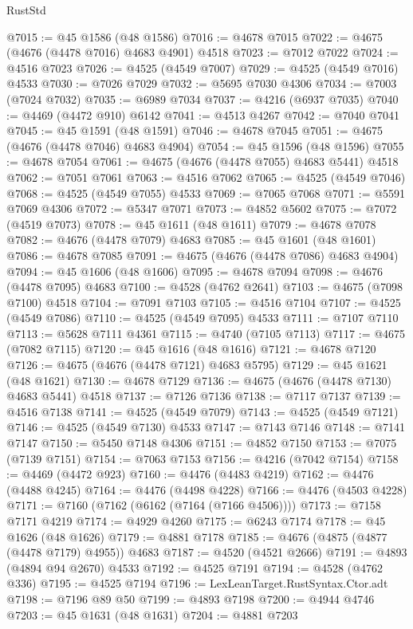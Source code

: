\begin{lexlean}{RustStd}
\begin{coremodule}
{\begin{coremodule}
{{{{{{{{{{{{{{{{{{{{{{{{{{{{{{{{{{{{{{{{{{{{{{{{{{{{{{{{{{{{@7015 := @45 @1586 (@48 @1586)
@7016 := @4678 @7015
@7022 := @4675 (@4676 (@4478 @7016) @4683 @4901) @4518
@7023 := @7012 @7022
@7024 := @4516 @7023
@7026 := @4525 (@4549 @7007)
@7029 := @4525 (@4549 @7016) @4533
@7030 := @7026 @7029
@7032 := @5695 @7030 @4306
@7034 := @7003 (@7024 @7032)
@7035 := @6989 @7034
@7037 := @4216 (@6937 @7035)
@7040 := @4469 (@4472 @910) @6142
@7041 := @4513 @4267
@7042 := @7040 @7041
@7045 := @45 @1591 (@48 @1591)
@7046 := @4678 @7045
@7051 := @4675 (@4676 (@4478 @7046) @4683 @4904)
@7054 := @45 @1596 (@48 @1596)
@7055 := @4678 @7054
@7061 := @4675 (@4676 (@4478 @7055) @4683 @5441) @4518
@7062 := @7051 @7061
@7063 := @4516 @7062
@7065 := @4525 (@4549 @7046)
@7068 := @4525 (@4549 @7055) @4533
@7069 := @7065 @7068
@7071 := @5591 @7069 @4306
@7072 := @5347 @7071
@7073 := @4852 @5602
@7075 := @7072 (@4519 @7073)
@7078 := @45 @1611 (@48 @1611)
@7079 := @4678 @7078
@7082 := @4676 (@4478 @7079) @4683
@7085 := @45 @1601 (@48 @1601)
@7086 := @4678 @7085
@7091 := @4675 (@4676 (@4478 @7086) @4683 @4904)
@7094 := @45 @1606 (@48 @1606)
@7095 := @4678 @7094
@7098 := @4676 (@4478 @7095) @4683
@7100 := @4528 (@4762 @2641)
@7103 := @4675 (@7098 @7100) @4518
@7104 := @7091 @7103
@7105 := @4516 @7104
@7107 := @4525 (@4549 @7086)
@7110 := @4525 (@4549 @7095) @4533
@7111 := @7107 @7110
@7113 := @5628 @7111 @4361
@7115 := @4740 (@7105 @7113)
@7117 := @4675 (@7082 @7115)
@7120 := @45 @1616 (@48 @1616)
@7121 := @4678 @7120
@7126 := @4675 (@4676 (@4478 @7121) @4683 @5795)
@7129 := @45 @1621 (@48 @1621)
@7130 := @4678 @7129
@7136 := @4675 (@4676 (@4478 @7130) @4683 @5441) @4518
@7137 := @7126 @7136
@7138 := @7117 @7137
@7139 := @4516 @7138
@7141 := @4525 (@4549 @7079)
@7143 := @4525 (@4549 @7121)
@7146 := @4525 (@4549 @7130) @4533
@7147 := @7143 @7146
@7148 := @7141 @7147
@7150 := @5450 @7148 @4306
@7151 := @4852 @7150
@7153 := @7075 (@7139 @7151)
@7154 := @7063 @7153
@7156 := @4216 (@7042 @7154)
@7158 := @4469 (@4472 @923)
@7160 := @4476 (@4483 @4219)
@7162 := @4476 (@4488 @4245)
@7164 := @4476 (@4498 @4228)
@7166 := @4476 (@4503 @4228)
@7171 := @7160 (@7162 (@6162 (@7164 (@7166 @4506))))
@7173 := @7158 @7171 @4219
@7174 := @4929 @4260
@7175 := @6243 @7174
@7178 := @45 @1626 (@48 @1626)
@7179 := @4881 @7178
@7185 := @4676 (@4875 (@4877 (@4478 @7179) @4955)) @4683
@7187 := @4520 (@4521 @2666)
@7191 := @4893 (@4894 @94 @2670) @4533
@7192 := @4525 @7191
@7194 := @4528 (@4762 @336)
@7195 := @4525 @7194
@7196 := LexLeanTarget.RustSyntax.Ctor.adt
@7198 := @7196 @89 @50
@7199 := @4893 @7198
@7200 := @4944 @4746
@7203 := @45 @1631 (@48 @1631)
@7204 := @4881 @7203
}}}}}}}}}}}}}}}}}}}}}}}}}}}}}}}}}}}}}}}}}}}}}}}}}}}}}}}}}}}}
\end{coremodule}}
\end{coremodule}
\end{lexlean}
